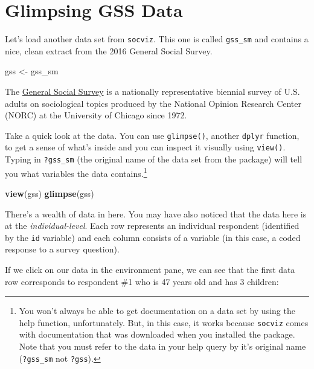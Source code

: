 \documentclass[
]{book}
\newenvironment{Shaded}{\begin{snugshade}}{\end{snugshade}}
\newcommand{\FunctionTok}[1]{\textcolor[rgb]{0.13,0.29,0.53}{\textbf{#1}}}
\newcommand{\NormalTok}[1]{#1}
\newcommand{\OtherTok}[1]{\textcolor[rgb]{0.56,0.35,0.01}{#1}}
\begin{document}
\hypertarget{glimpsing-gss-data}{%
\section{Glimpsing GSS Data}\label{glimpsing-gss-data}}

Let's load another data set from \texttt{socviz}. This one is called \texttt{gss\_sm} and contains a nice, clean extract from the 2016 General Social Survey.

\begin{Shaded}
\begin{Highlighting}[]
\NormalTok{gss }\OtherTok{\textless{}{-}}\NormalTok{ gss\_sm}
\end{Highlighting}
\end{Shaded}

The \href{https://gss.norc.org/}{General Social Survey} is a nationally representative biennial survey of U.S. adults on sociological topics produced by the National Opinion Research Center (NORC) at the University of Chicago since 1972.

Take a quick look at the data. You can use \texttt{glimpse()}, another \texttt{dplyr} function, to get a sense of what's inside and you can inspect it visually using \texttt{view()}. Typing in \texttt{?gss\_sm} (the original name of the data set from the package) will tell you what variables the data contains.\footnote{You won't always be able to get documentation on a data set by using the help function, unfortunately. But, in this case, it works because \texttt{socviz} comes with documentation that was downloaded when you installed the package. Note that you must refer to the data in your help query by it's original name (\texttt{?gss\_sm} not \texttt{?gss}).}

\begin{Shaded}
\begin{Highlighting}[]
\FunctionTok{view}\NormalTok{(gss)}
\FunctionTok{glimpse}\NormalTok{(gss)}
\end{Highlighting}
\end{Shaded}

There's a wealth of data in here. You may have also noticed that the data here is at the \emph{individual-level}. Each row represents an individual respondent (identified by the \texttt{id} variable) and each column consists of a variable (in this case, a coded response to a survey question).

If we click on our data in the environment pane, we can see that the first data row corresponds to respondent \#1 who is 47 years old and has 3 children:
\end{document}
